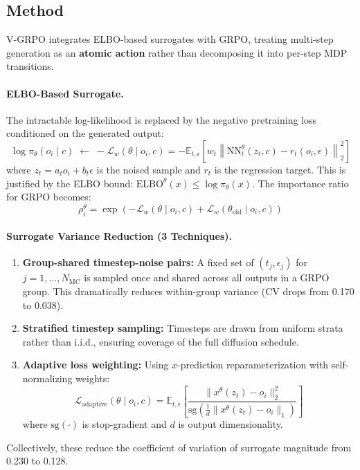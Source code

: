 \documentclass[11pt]{article}
\begin{document}
\subsection{Method}

V-GRPO integrates ELBO-based surrogates with GRPO, treating multi-step generation as an \textbf{atomic action} rather than decomposing it into per-step MDP transitions.

\paragraph{ELBO-Based Surrogate.}
The intractable log-likelihood is replaced by the negative pretraining loss conditioned on the generated output:
\begin{equation}
    \log \pi_\theta(o_i \mid c) \;\longleftarrow\; -\mathcal{L}_w(\theta \mid o_i, c) = -\mathbb{E}_{t, \epsilon}\!\left[w_t \left\| \mathrm{NN}_t^\theta(z_t, c) - r_t(o_i, \epsilon)\right\|_2^2\right]
\end{equation}
where $z_t = a_t o_i + b_t \epsilon$ is the noised sample and $r_t$ is the regression target. This is justified by the ELBO bound: $\mathrm{ELBO}^\theta(x) \leq \log \pi_\theta(x)$. The importance ratio for GRPO becomes:
\begin{equation}
    \rho_i^\theta = \exp\!\left(-\mathcal{L}_w(\theta \mid o_i, c) + \mathcal{L}_w(\theta_{\mathrm{old}} \mid o_i, c)\right)
\end{equation}

\paragraph{Surrogate Variance Reduction (3 Techniques).}
\begin{enumerate}
    \item \textbf{Group-shared timestep-noise pairs:} A fixed set of $(t_j, \epsilon_j)$ for $j = 1, \ldots, N_{\mathrm{MC}}$ is sampled once and shared across all outputs in a GRPO group. This dramatically reduces within-group variance (CV drops from 0.170 to 0.038).
    \item \textbf{Stratified timestep sampling:} Timesteps are drawn from uniform strata rather than i.i.d., ensuring coverage of the full diffusion schedule.
    \item \textbf{Adaptive loss weighting:} Using $x$-prediction reparameterization with self-normalizing weights:
    \begin{equation}
        \mathcal{L}_{\mathrm{adaptive}}(\theta \mid o_i, c) = \mathbb{E}_{t, \epsilon}\!\left[\frac{\|x^\theta(z_t) - o_i\|_2^2}{\mathrm{sg}\!\left(\frac{1}{d}\|x^\theta(z_t) - o_i\|_1\right)}\right]
    \end{equation}
    where $\mathrm{sg}(\cdot)$ is stop-gradient and $d$ is output dimensionality.
\end{enumerate}
Collectively, these reduce the coefficient of variation of surrogate magnitude from 0.230 to 0.128.
\end{document}

